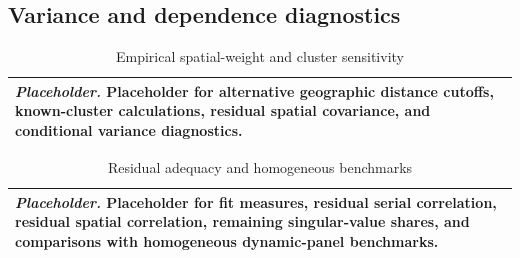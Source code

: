 \documentclass[11pt]{article}
\numberwithin{equation}{section}
\theoremstyle{remark}
\newcommand{\placeholdertable}[3]{%
\begin{table}[!htbp]
\centering
\caption{#1}
\label{#2}
\begin{tabular}{p{0.88\textwidth}}
\toprule
\textit{Placeholder.} #3\\
\bottomrule
\end{tabular}
\end{table}}
\begin{document}
\subsection{Variance and dependence diagnostics}

\placeholdertable{Empirical spatial-weight and cluster sensitivity}{tab:app_emp_dependence}{Placeholder for alternative geographic distance cutoffs, known-cluster calculations, residual spatial covariance, and conditional variance diagnostics.}

\placeholdertable{Residual adequacy and homogeneous benchmarks}{tab:app_emp_fit}{Placeholder for fit measures, residual serial correlation, residual spatial correlation, remaining singular-value shares, and comparisons with homogeneous dynamic-panel benchmarks.}
\end{document}
